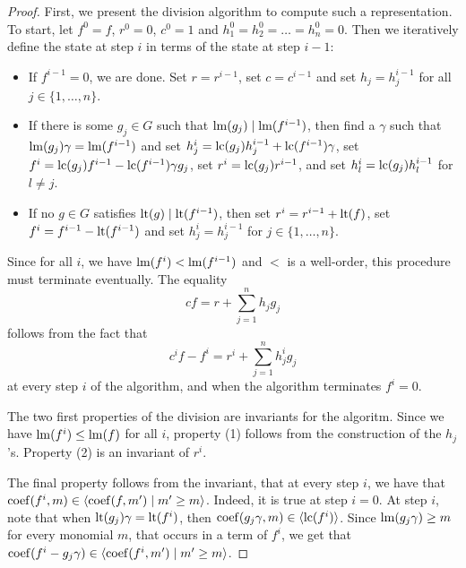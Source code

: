 \begin{proof}
  First, we present the division algorithm to compute such a representation. To start, let $f^{0} = f$, $r^{0} = 0$, $c^{0} = 1$ and $h_{1}^{0} = h_{2}^{0} = \dots = h_{n}^{0} = 0$. Then we iteratively define the state at step $i$ in terms of the state at step $i-1$:
  \begin{itemize}
    \item If $f^{i-1} = 0$, we are done. Set $r = r^{i-1}$, set $c = c^{i-1}$ and set $h_{j} = h_{j}^{i-1}$ for all $j \in \{1, \dots, n\}$.
    \item If there is some $g_{j} \in G$ such that $\operatorname{lm}(g_{j}) \mid \operatorname{lm}(f^{i-1})$, then find a $\gamma$ such that $\operatorname{lm}(g_{j})\gamma = \operatorname{lm}(f^{i-1})$ and set $h_{j}^{i} = \operatorname{lc}(g_{j}) h_{j}^{i-1} + \operatorname{lc}(f^{i-1}) \gamma$, set $f^{i} = \operatorname{lc}(g_{j}) f^{i-1} - \operatorname{lc}(f^{i-1}) \gamma g_{j}$, set $r^{i} = \operatorname{lc}(g_{j}) r^{i-1}$, and set $h_{l}^{i} = \operatorname{lc}(g_{j}) h_{l}^{i-1}$ for $l \neq j$.
    \item If no $g \in G$ satisfies $\operatorname{lt}(g) \mid \operatorname{lt}(f^{i-1})$, then set $r^{i} = r^{i-1} + \operatorname{lt}(f)$, set $f^{i} = f^{i-1} - \operatorname{lt}(f^{i-1})$ and set $h_{j}^{i} = h_{j}^{i-1}$ for $j \in \{1, \dots, n\}$.
  \end{itemize}

  Since for all $i$, we have $\operatorname{lm}(f^{i}) < \operatorname{lm}(f^{i-1})$ and $<$ is a well-order, this procedure must terminate eventually. The equality
  \[c f = r + \sum_{j=1}^{n} h_{j} g_{j}\] follows from the fact that
  \[c^{i} f - f^{i} = r^{i} + \sum_{j=1}^{n} h^{i}_{j} g_{j}\]
  at every step $i$ of the algorithm, and when the algorithm terminates $f^{i} = 0$.

  The two first properties of the division are invariants for the algoritm. Since we have $\operatorname{lm}(f^{i}) \leq \operatorname{lm}(f)$ for all $i$, property (1) follows from the construction of the $h_{j}$'s. Property (2) is an invariant of $r^{i}$.

  The final property follows from the invariant, that at every step $i$, we have that $\operatorname{coef}(f^{i}, m) \in \langle \operatorname{coef}(f, m') \mid m' \geq m \rangle$. Indeed, it is true at step $i=0$. At step $i$, note that when $\operatorname{lt}(g_{j}) \gamma = \operatorname{lt}(f^{i})$, then $\operatorname{coef}(g_{j} \gamma, m) \in \langle \operatorname{lc}(f^{i}) \rangle$. Since $\operatorname{lm}(g_{j} \gamma) \geq m$ for every monomial $m$, that occurs in a term of $f^{i}$, we get that $\operatorname{coef}(f^{i} - g_{j} \gamma) \in \langle \operatorname{coef}(f^{i}, m') \mid m' \geq m \rangle$.
\end{proof}




